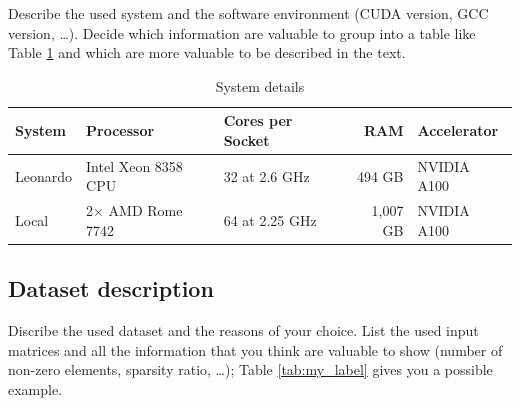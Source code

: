 \documentclass[conference]{IEEEtran}
\begin{document}
Describe the used system and the software environment (CUDA version, GCC version, \dots). Decide which information are valuable to group into a table like Table \ref{tab:system_description} and which are more valuable to be described in the text.

\begin{table}[ht]
    \centering
    \begin{adjustbox}{width=\columnwidth}
    \begin{tabular}{lllrl}
    \toprule
    \textbf{System} &  \textbf{Processor} & \textbf{Cores per Socket} & \textbf{RAM} & \textbf{Accelerator} \\
    \midrule
    Leonardo &  Intel Xeon 8358 CPU & 32 at 2.6 GHz & 494 GB & NVIDIA A100 \\
    Local &  2$\times$ AMD Rome 7742 & 64 at 2.25 GHz & 1,007 GB & NVIDIA A100 \\
    \bottomrule
    \end{tabular}
    \end{adjustbox}
    \vspace{1em}
    
    \caption{System details}
    \label{tab:system_description}
\end{table}

\subsection{Dataset description}

Discribe the used dataset and the reasons of your choice. List the used input matrices and all the information that you think are valuable to show (number of non-zero elements, sparsity ratio, \dots); Table \ref{tab:my_label} gives you a possible example.
\end{document}
